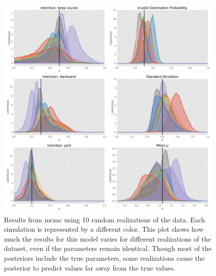 \begin{figure}[h]
    \centering
    \includegraphics[width=\textwidth]{figures/mc_sim_mcmc.png}
    \caption{Results from \acrshort{mcmc} using 10 random realizations of the data. Each simulation is represented by a different color. This plot shows how much the results for this model varies for different realizations of the dataset, even if the parameters remain identical. Though most of the posteriors include the true parameters, some realizations cause the posterior to predict values far away from the true values.}
    \label{fig:example_mc_mcmc}
\end{figure}

